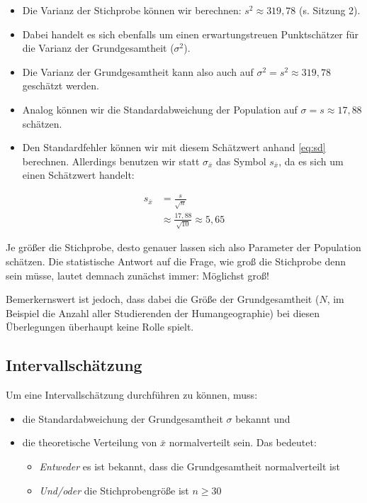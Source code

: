 \documentclass[
  ngerman,
]{article}
\providecommand{\tightlist}{%
  \setlength{\itemsep}{0pt}\setlength{\parskip}{0pt}}
\begin{document}
\begin{itemize}
\tightlist
\item
  Die Varianz der Stichprobe können wir berechnen: \(s^2\approx319{,}78\) (s. Sitzung 2).
\item
  Dabei handelt es sich ebenfalls um einen erwartungstreuen Punktschätzer für die Varianz der Grundgesamtheit (\(\sigma^2\)).
\item
  Die Varianz der Grundgesamtheit kann also auch auf \(\sigma^2=s^2\approx319{,}78\) geschätzt werden.
\item
  Analog können wir die Standardabweichung der Population auf \(\sigma=s\approx17,88\) schätzen.
\item
  Den Standardfehler können wir mit diesem Schätzwert anhand \autoref{eq:sd} berechnen. Allerdings benutzen wir statt \(\sigma_{\bar{x}}\) das Symbol \(s_{\bar{x}}\), da es sich um einen Schätzwert handelt:
\end{itemize}

\nopagebreak

\[\begin{aligned}
s_{\bar{x}} &= \frac{s}{\sqrt{n}}\\[4pt]
&\approx \frac{17{,}88}{\sqrt{10}}\approx5{,}65
\end{aligned}\]

Je größer die Stichprobe, desto genauer lassen sich also Parameter der Population schätzen. Die statistische Antwort auf die Frage, wie groß die Stichprobe denn sein müsse, lautet demnach zunächst immer: Möglichst groß!

Bemerkernswert ist jedoch, dass dabei die Größe der Grundgesamtheit (\(N\), im Beispiel die Anzahl aller Studierenden der Humangeographie) bei diesen Überlegungen überhaupt keine Rolle spielt.

\hypertarget{intervallschuxe4tzung}{%
\subsection{Intervallschätzung}\label{intervallschuxe4tzung}}

Um eine Intervallschätzung durchführen zu können, muss:

\begin{itemize}
\tightlist
\item
  die Standardabweichung der Grundgesamtheit \(\sigma\) bekannt und
\item
  die theoretische Verteilung von \(\bar{x}\) normalverteilt sein. Das bedeutet:

  \begin{itemize}
  \tightlist
  \item
    \emph{Entweder} es ist bekannt, dass die Grundgesamtheit normalverteilt ist
  \item
    \emph{Und/oder} die Stichprobengröße ist \(n\geq30\)
  \end{itemize}
\end{itemize}
\end{document}
